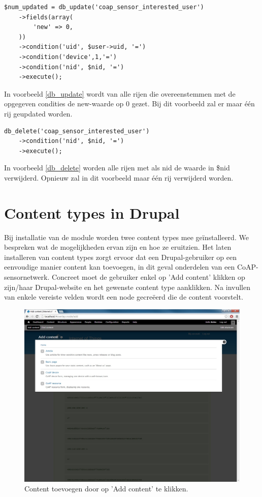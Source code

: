 \lstset{language=PHP}
\begin{lstlisting}[label=db_update,caption=Voorbeeld gebruik van db\_update]
$num_updated = db_update('coap_sensor_interested_user')
	->fields(array(
		'new' => 0,
	))
	->condition('uid', $user->uid, '=')
	->condition('device',1,'=')
	->condition('nid', $nid, '=')
	->execute();
\end{lstlisting}
In voorbeeld \ref{db_update} wordt van alle rijen die overeenstemmen met de opgegeven condities de new-waarde op 0 gezet. Bij dit voorbeeld zal er maar \'{e}\'{e}n rij geupdated worden.

\lstset{language=PHP}
\begin{lstlisting}[label=db_delete,caption=Voorbeeld gebruik van db\_delete]
db_delete('coap_sensor_interested_user')
	->condition('nid', $nid, '=')
	->execute();
\end{lstlisting}
In voorbeeld \ref{db_delete} worden alle rijen met als nid de waarde in \$nid verwijderd. Opnieuw zal in dit voorbeeld maar \'{e}\'{e}n rij verwijderd worden.

\section{Content types in Drupal}

Bij installatie van de module worden twee content types mee ge\"{i}nstalleerd. We bespreken wat de mogelijkheden ervan zijn en hoe ze eruitzien. Het laten installeren van content types zorgt ervoor dat een Drupal-gebruiker op een eenvoudige manier content kan toevoegen, in dit geval onderdelen van een CoAP-sensornetwerk. Concreet moet de gebruiker enkel op 'Add content' klikken op zijn/haar Drupal-website en het gewenste content type aanklikken. Na invullen van enkele vereiste velden wordt een node gecre\"{e}erd die de content voorstelt.
\begin{figure}[h!]
\centering
\includegraphics[width=1\textwidth]{fig/add_content}
\caption{Content toevoegen door op 'Add content' te klikken.}
\label{fig:addContent}
\end{figure}

